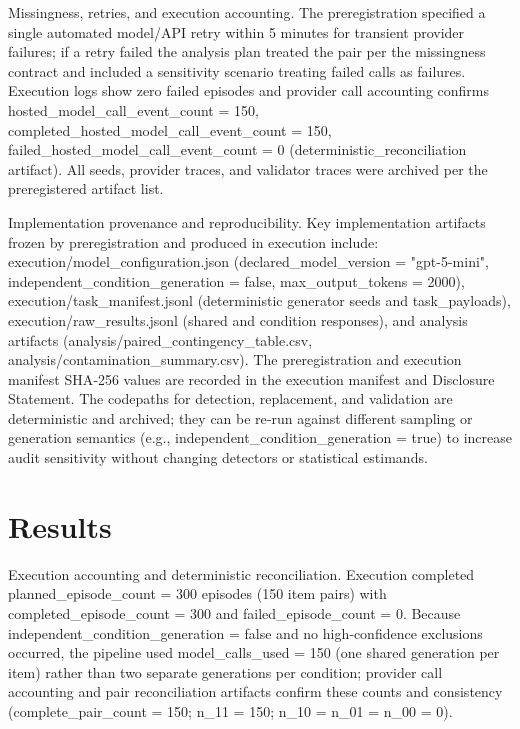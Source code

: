 \documentclass[conference]{IEEEtran}
\begin{document}
Missingness, retries, and execution accounting. The preregistration specified a single automated model/API retry within 5 minutes for transient provider failures; if a retry failed the analysis plan treated the pair per the missingness contract and included a sensitivity scenario treating failed calls as failures. Execution logs show zero failed episodes and provider call accounting confirms hosted\_model\_call\_event\_count = 150, completed\_hosted\_model\_call\_event\_count = 150, failed\_hosted\_model\_call\_event\_count = 0 (deterministic\_reconciliation artifact). All seeds, provider traces, and validator traces were archived per the preregistered artifact list.

Implementation provenance and reproducibility. Key implementation artifacts frozen by preregistration and produced in execution include: execution/model\_configuration.json (declared\_model\_version = "gpt-5-mini", independent\_condition\_generation = false, max\_output\_tokens = 2000), execution/task\_manifest.jsonl (deterministic generator seeds and task\_payloads), execution/raw\_results.jsonl (shared and condition responses), and analysis artifacts (analysis/paired\_contingency\_table.csv, analysis/contamination\_summary.csv). The preregistration and execution manifest SHA‑256 values are recorded in the execution manifest and Disclosure Statement. The codepaths for detection, replacement, and validation are deterministic and archived; they can be re‑run against different sampling or generation semantics (e.g., independent\_condition\_generation = true) to increase audit sensitivity without changing detectors or statistical estimands.

\section{Results}
Execution accounting and deterministic reconciliation. Execution completed planned\_episode\_count = 300 episodes (150 item pairs) with completed\_episode\_count = 300 and failed\_episode\_count = 0. Because independent\_condition\_generation = false and no high‑confidence exclusions occurred, the pipeline used model\_calls\_used = 150 (one shared generation per item) rather than two separate generations per condition; provider call accounting and pair reconciliation artifacts confirm these counts and consistency (complete\_pair\_count = 150; n\_11 = 150; n\_10 = n\_01 = n\_00 = 0).
\end{document}
